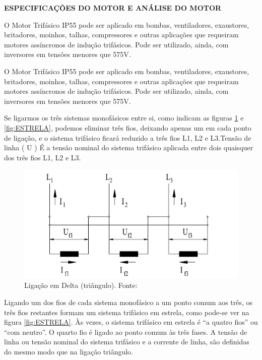 \textbf{ESPECIFICAÇÕES DO MOTOR E ANÁLISE DO MOTOR}

O Motor Trifásico IP55 pode ser aplicado em bombas, ventiladores, exaustores, britadores, moinhos, talhas, compressores e outras aplicações que requeiram motores assíncronos de indução trifásicos. Pode ser utilizado, ainda, com inversores em tensões menores que 575V. \cite{WEG_catalogo}

O Motor Trifásico IP55 pode ser aplicado em bombas, ventiladores, exaustores, britadores, moinhos, talhas, compressores e outras aplicações que requeiram motores assíncronos de indução trifásicos. Pode ser utilizado, ainda, com inversores em tensões menores que 575V. \cite{WEG_catalogo}

Se ligarmos os três sistemas monofásicos entre si, como indicam as figuras \ref{fig:TRIANGULO} e \ref{fig:ESTRELA}, podemos eliminar três fios, deixando apenas um em cada ponto de ligação, e o sistema trifásico ficará reduzido a três fios L1, L2 e L3.Tensão de linha ( U ) É a tensão nominal do sistema trifásico aplicada entre dois quaisquer dos
três fios L1, L2 e L3.

\begin{figure}[!ht]
\centering
\includegraphics[scale=0.8]{figuras/TRIANGULO.png}
\caption{Ligação em Delta (triângulo). Fonte:\cite{WEG_catalogo}}
\label{fig:TRIANGULO}
\end{figure}

Ligando um dos fios de cada sistema monofásico a um ponto comum aos três, os três fios restantes formam um sistema trifásico em estrela, como pode-se ver na figura  \ref{fig:ESTRELA}. Às vezes, o sistema trifásico em estrela é “a quatro fios” ou “com neutro”. O quarto fio é ligado ao ponto comum às três fases. A tensão de linha ou tensão nominal do sistema trifásico e a corrente de linha, são definidas do mesmo modo que na ligação triângulo.\cite{WEG_catalogo}

